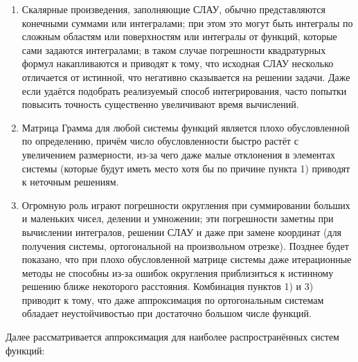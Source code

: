 ﻿\documentclass[a4paper, 12pt]{article}
\begin{document}
\begin{enumerate}
\item  Скалярные произведения, заполняющие СЛАУ, обычно представляются конечными суммами или интегралами; при этом это могут быть интегралы по сложным областям или поверхностям или интегралы от функций, которые сами задаются интегралами; в таком случае погрешности квадратурных формул накапливаются и приводят к тому, что исходная СЛАУ несколько отличается от истинной, что негативно сказывается на решении задачи. Даже если удаётся подобрать реализуемый способ интегрирования, часто попытки повысить точность существенно увеличивают время вычислений.

\item  Матрица Грамма для любой системы функций является плохо обусловленной по определению, причём число обусловленности быстро растёт с увеличением размерности, из-за чего даже малые отклонения в элементах системы (которые будут иметь место хотя бы по причине пункта 1) приводят к неточным решениям.

\item  Огромную роль играют погрешности округления при суммировании больших и маленьких чисел, делении и умножении; эти погрешности заметны при вычислении интегралов, решении СЛАУ и даже при замене координат (для получения системы, ортогональной на произвольном отрезке). Позднее будет показано, что при плохо обусловленной матрице системы даже итерационные методы не способны из-за ошибок округления приблизиться к истинному решению ближе некоторого расстояния. Комбинация пунктов 1) и 3) приводит к тому, что даже аппроксимация по  ортогональным системам обладает неустойчивостью при достаточно большом числе функций.
\end{enumerate}

Далее рассматривается аппроксимация для наиболее распространённых систем функций:
\end{document}

